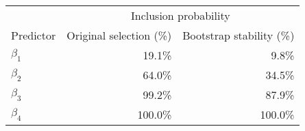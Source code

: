 \begin{tabular*}{\linewidth}{@{\extracolsep{\fill}}lrr}
\toprule
 & \multicolumn{2}{c}{Inclusion probability} \\ 
\cmidrule(lr){2-3}
Predictor & Original
selection (\%) & Bootstrap
stability (\%) \\ 
\midrule\addlinespace[2.5pt]
\(\beta_{1}\) & 19.1\% & 9.8\% \\ 
\(\beta_{2}\) & 64.0\% & 34.5\% \\ 
\(\beta_{3}\) & 99.2\% & 87.9\% \\ 
\(\beta_{4}\) & 100.0\% & 100.0\% \\ 
\bottomrule
\end{tabular*}

